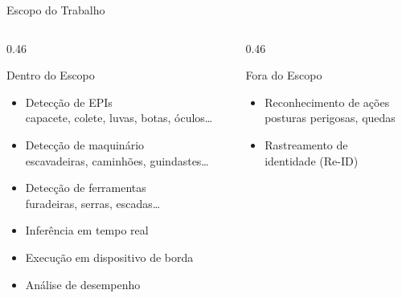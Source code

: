 \begin{frame}{Escopo do Trabalho}
  \vfill

  \begin{columns}[T]
    \begin{column}{0.46\textwidth}
      {
      \begin{block}{\centering Dentro do Escopo}
        \medskip
        \begin{itemize}
          \item[\color{headcolor}$\boldsymbol{\checkmark}$] Detec\c{c}\~{a}o de EPIs\\
            {\tiny capacete, colete, luvas, botas, \'{o}culos\ldots}
          \item[\color{headcolor}$\boldsymbol{\checkmark}$] Detec\c{c}\~{a}o de maquin\'{a}rio\\
            {\tiny escavadeiras, caminh\~{o}es, guindastes\ldots}
          \item[\color{headcolor}$\boldsymbol{\checkmark}$] Detec\c{c}\~{a}o de ferramentas\\
            {\tiny furadeiras, serras, escadas\ldots}
          \item[\color{headcolor}$\boldsymbol{\checkmark}$] Infer\^{e}ncia em tempo real
          \item[\color{headcolor}$\boldsymbol{\checkmark}$] Execu\c{c}\~{a}o em dispositivo de borda
          \item[\color{headcolor}$\boldsymbol{\checkmark}$] An\'{a}lise de desempenho
        \end{itemize}
        \medskip
      \end{block}
      }
    \end{column}
    \begin{column}{0.46\textwidth}
      {
      \begin{block}{\centering Fora do Escopo}
        \medskip
        \begin{itemize}
          \item[\color{skipcolor}$\boldsymbol{\times}$] Reconhecimento de a\c{c}\~{o}es\\
            {\tiny posturas perigosas, quedas}
          \item[\color{skipcolor}$\boldsymbol{\times}$] Rastreamento de\\identidade (Re-ID)

\end{itemize}
\end{block}}
\end{column}
\end{columns}
\end{frame}
